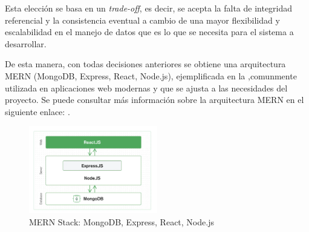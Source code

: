 Esta elección se basa en un \textit{trade-off}, es decir, se acepta la falta de integridad referencial y la consistencia eventual a cambio de una mayor flexibilidad y escalabilidad en el manejo de datos que es lo que se necesita para el sistema a desarrollar.

De esta manera, con todas decisiones anteriores se obtiene una arquitectura MERN (MongoDB, Express, React, Node.js), ejemplificada en la ,comunmente utilizada en aplicaciones web modernas y que se ajusta a las necesidades del proyecto. 
Se puede consultar más información sobre la arquitectura MERN en el siguiente enlace: .
\begin{figure}[H]
    \centering
    \includegraphics[width=0.5\textwidth]{figures/4-Estudio-viabilidad/4_MERN.png}
    \caption{MERN Stack: MongoDB, Express, React, Node.js}
    \label{fig:arquitectura_mern}
    \hypertarget{fig:arquitectura_mern}{}
\end{figure}
